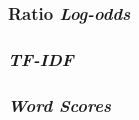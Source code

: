 \subsubsection{Ratio \textit{Log-odds}}

\subsubsection{\textit{TF-IDF}}

\subsubsection{\textit{Word Scores}}


